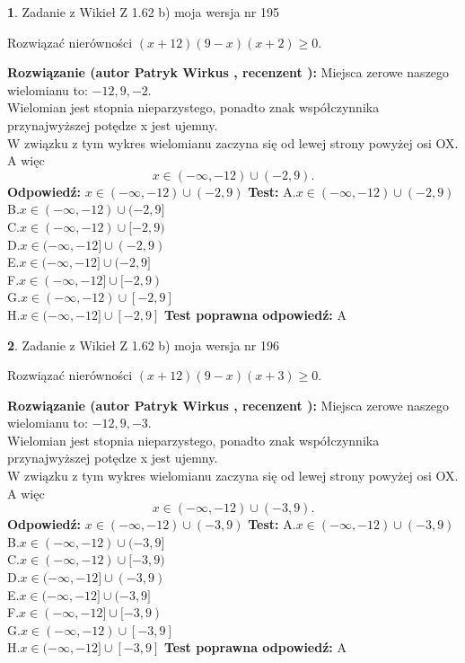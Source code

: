\documentclass[12pt, a4paper]{article}
\theoremstyle{definition} %
\newtheorem{zad}{}
\newcommand{\zadStart}[1]{\begin{zad}#1\newline}
\newcommand{\zadStop}{\end{zad}}
\newcommand{\rozwStart}[2]{\noindent \textbf{Rozwiązanie (autor #1 , recenzent #2): }\newline}
\newcommand{\rozwStop}{\newline}
\newcommand{\odpStart}{\noindent \textbf{Odpowiedź:}\newline}
\newcommand{\odpStop}{\newline}
\newcommand{\testStart}{\noindent \textbf{Test:}\newline}
\newcommand{\testStop}{\newline}
\newcommand{\kluczStart}{\noindent \textbf{Test poprawna odpowiedź:}\newline}
\newcommand{\kluczStop}{\newline}
\begin{document}
\zadStart{Zadanie z Wikieł Z 1.62 b) moja wersja nr 195}

Rozwiązać nierówności $(x+12)(9-x)(x+2)\ge0$.
\zadStop
\rozwStart{Patryk Wirkus}{}
Miejsca zerowe naszego wielomianu to: $-12, 9, -2$.\\
Wielomian jest stopnia nieparzystego, ponadto znak współczynnika przy\linebreak najwyższej potędze x jest ujemny.\\ W związku z tym wykres wielomianu zaczyna się od lewej strony powyżej osi OX. A więc $$x \in (-\infty,-12) \cup (-2,9).$$
\rozwStop
\odpStart
$x \in (-\infty,-12) \cup (-2,9)$
\odpStop
\testStart
A.$x \in (-\infty,-12) \cup (-2,9)$\\
B.$x \in (-\infty,-12) \cup (-2,9]$\\
C.$x \in (-\infty,-12) \cup [-2,9)$\\
D.$x \in (-\infty,-12] \cup (-2,9)$\\
E.$x \in (-\infty,-12] \cup (-2,9]$\\
F.$x \in (-\infty,-12] \cup [-2,9)$\\
G.$x \in (-\infty,-12) \cup [-2,9]$\\
H.$x \in (-\infty,-12] \cup [-2,9]$
\testStop
\kluczStart
A
\kluczStop



\zadStart{Zadanie z Wikieł Z 1.62 b) moja wersja nr 196}

Rozwiązać nierówności $(x+12)(9-x)(x+3)\ge0$.
\zadStop
\rozwStart{Patryk Wirkus}{}
Miejsca zerowe naszego wielomianu to: $-12, 9, -3$.\\
Wielomian jest stopnia nieparzystego, ponadto znak współczynnika przy\linebreak najwyższej potędze x jest ujemny.\\ W związku z tym wykres wielomianu zaczyna się od lewej strony powyżej osi OX. A więc $$x \in (-\infty,-12) \cup (-3,9).$$
\rozwStop
\odpStart
$x \in (-\infty,-12) \cup (-3,9)$
\odpStop
\testStart
A.$x \in (-\infty,-12) \cup (-3,9)$\\
B.$x \in (-\infty,-12) \cup (-3,9]$\\
C.$x \in (-\infty,-12) \cup [-3,9)$\\
D.$x \in (-\infty,-12] \cup (-3,9)$\\
E.$x \in (-\infty,-12] \cup (-3,9]$\\
F.$x \in (-\infty,-12] \cup [-3,9)$\\
G.$x \in (-\infty,-12) \cup [-3,9]$\\
H.$x \in (-\infty,-12] \cup [-3,9]$
\testStop
\kluczStart
A
\kluczStop
\end{document}
